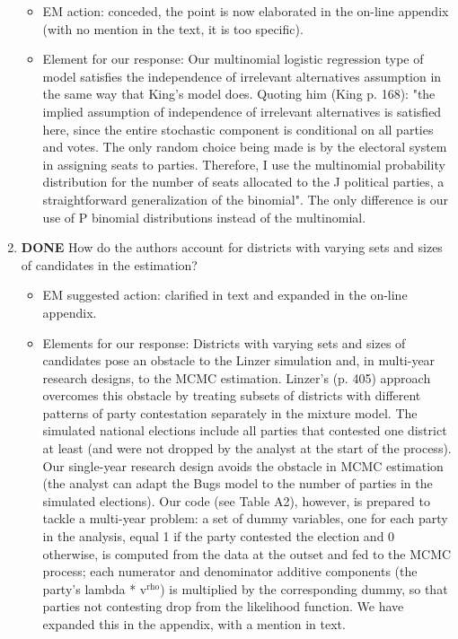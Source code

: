 \documentclass{article}
\begin{document}
\begin{enumerate}
\label{sec:orgheadline26}
\begin{itemize}
\item EM action: conceded, the point is now elaborated in the on-line appendix (with no mention in the text, it is too specific).
\item Element for our response: Our multinomial logistic regression type of model satisfies the independence of irrelevant alternatives assumption in the same way that King's model does. Quoting him (King p. 168): "the implied assumption of independence of irrelevant alternatives is satisfied here, since the entire stochastic component is conditional on all parties and votes. The only random choice being made is by the electoral system in assigning seats to parties. Therefore, I use the multinomial probability distribution for the number of seats allocated to the J political parties, a straightforward generalization of the binomial". The only difference is our use of P binomial distributions instead of the multinomial.
\end{itemize}
\item {\bfseries\sffamily DONE} How do the authors account for districts with varying sets and sizes of candidates in the estimation?
\label{sec:orgheadline27}
\begin{itemize}
\item EM suggested action: clarified in text and expanded in the on-line appendix.
\item Elements for our response: Districts with varying sets and sizes of candidates pose an obstacle to the Linzer simulation and, in multi-year research designs, to the MCMC estimation. Linzer's (p. 405) approach overcomes this obstacle by treating subsets of districts with different patterns of party contestation separately in the mixture model. The simulated national elections include all parties that contested one district at least (and were not dropped by the analyst at the start of the process). Our single-year research design avoids the obstacle in MCMC estimation (the analyst can adapt the Bugs model to the number of parties in the simulated elections). Our code (see Table A2), however, is prepared to tackle a multi-year problem: a set of dummy variables, one for each party in the analysis, equal 1 if the party contested the election and 0 otherwise, is computed from the data at the outset and fed to the MCMC process; each numerator and denominator additive components (the party's lambda * v\(^{\text{rho}}\)) is multiplied by the corresponding dummy, so that parties not contesting drop from the likelihood function. We have expanded this in the appendix, with a mention in text.

\end{itemize}
\end{enumerate}
\end{document}
